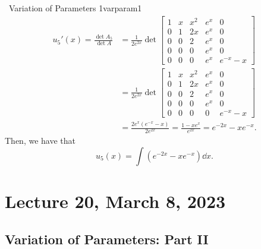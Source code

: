 \begin{example}{\Difficulty\,\Difficulty\,\,Variation of Parameters 1}{varparam1}
            \begin{align*}
                u_5'(x)=\frac{\det A_5}{\det A}&=\frac{1}{2e^{2x}}\det \begin{bmatrix}
                1 & x & x^2 & e^x & 0 \\
                0 & 1 & 2x & e^x & 0 \\
                0 & 0 & 2 & e^x & 0 \\
                0 & 0 & 0 & e^x & 0 \\
                0 & 0 & 0 &  e^x & e^{-x}-x
            \end{bmatrix} \\
            &=\frac{1}{2e^{2x}}\det \begin{bmatrix}
                1 & x & x^2 & e^x & 0 \\
                0 & 1 & 2x & e^x & 0 \\
                0 & 0 & 2 & e^x & 0 \\
                0 & 0 & 0 & e^x & 0 \\
                0 & 0 & 0 & 0 & e^{-x}-x
            \end{bmatrix} \\
            &=\frac{2e^x(e^{-x}-x)}{2e^{2x}}=\frac{1-xe^{x}}{e^{2x}}=e^{-2x}-xe^{-x}.
            \end{align*}
            Then, we have that
            \begin{equation*}
                u_5(x)=\int (e^{-2x}-xe^{-x})\dd x.
            \end{equation*}
        \end{example}

\section{Lecture 20, March 8, 2023}

    \subsection{Variation of Parameters: Part II}

